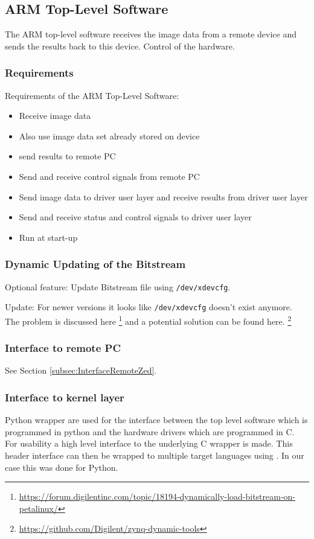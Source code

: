 \subsection{ARM Top-Level Software}
The ARM top-level software receives the image data from a remote device and sends the results back to this device. Control of the hardware.

\subsubsection{Requirements}
Requirements of the ARM Top-Level Software:
\begin{itemize} 
	\item Receive image data
	\item Also use image data set already stored on device
	\item send results to remote PC
	\item Send and receive control signals from remote PC
	\item Send image data to driver user layer and receive results from driver user layer
	\item Send and receive status and control signals to driver user layer
	\item Run at start-up 
\end{itemize}

\subsubsection{Dynamic Updating of the Bitstream}

Optional feature: Update Bitstream file using \texttt{/dev/xdevcfg}.

Update: For newer versions it looks like \texttt{/dev/xdevcfg} doesn't exist anymore. The problem is discussed here \footnote{\url{https://forum.digilentinc.com/topic/18194-dynamically-load-bitstream-on-petalinux/}} and a potential solution can be found here. \footnote{\url{https://github.com/Digilent/zynq-dynamic-tools}}

\subsubsection{Interface to remote PC}
See Section \ref{subsec:InterfaceRemoteZed}.  
\subsubsection{Interface to kernel layer}
Python wrapper are used for the interface between the top level software which is programmed in python and the hardware drivers which are programmed in C. For usability a high level interface to the underlying C wrapper is made. 
This header interface can then be wrapped to multiple target languages using \cite{Swig2020}. In our case this was done for Python.

